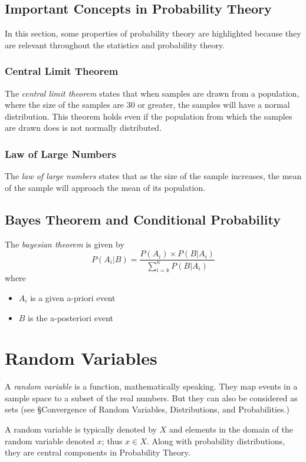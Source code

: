 \documentclass{article}
\begin{document}
\subsection{Important Concepts in Probability Theory}
In this section, some properties of probability theory are highlighted because they are relevant throughout the statistics and probability theory.

\subsubsection{Central Limit Theorem}
The \emph{central limit theorem} states that when samples are drawn from a population, where the size of the samples are 30 or greater, the samples will have a normal distribution. This theorem holds even if the population from which the samples are drawn does is not normally distributed.

\subsubsection{Law of Large Numbers}
The \emph{law of large numbers} states that as the size of the sample increases, the mean of the sample will approach the mean of its population.


\subsection{Bayes Theorem and Conditional Probability}
The \emph{bayesian theorem} is given by
$$ P(A_i | B)  = \frac{P(A_i) \times P(B|A_i)}{ \sum_{i=k}^{n} P(B|A_i) } $$
where \hfill \break
\begin{itemize}
    \item $A_i$ is a given a-priori event
    \item $B$ is the a-posteriori event
    
\end{itemize}

\newpage
\section{Random Variables}
A \emph{random variable} is a function, mathematically speaking. They map events in a sample space to a subset of the real numbers. But they can also be considered as sets (see §Convergence of Random Variables, Distributions, and Probabilities.) 

A random variable is typically denoted by $X$ and elements in the domain of the random variable denoted $x$; thus $x \in X$. Along with probability distributions, they are central components in Probability Theory.
\end{document}
